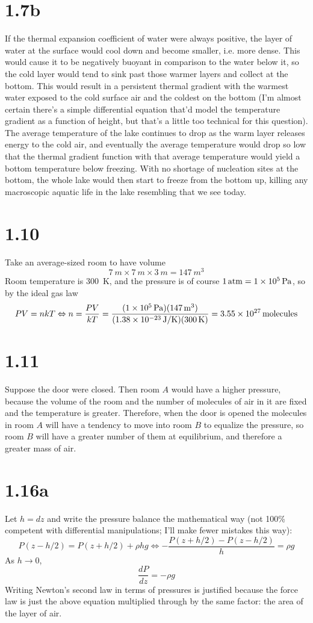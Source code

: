 \documentclass{article}
\begin{document}
\section*{1.7b}
If the thermal expansion coefficient of water were always positive, the layer of water at the surface would cool down and become smaller, i.e. more dense. This would cause it to be negatively buoyant in comparison to the water below it, so the cold layer would tend to sink past those warmer layers and collect at the bottom. This would result in a persistent thermal gradient with the warmest water exposed to the cold surface air and the coldest on the bottom (I'm almost certain there's a simple differential equation that'd model the temperature gradient as a function of height, but that's a little too technical for this question). The average temperature of the lake continues to drop as the warm layer releases energy to the cold air, and eventually the average temperature would drop so low that the thermal gradient function with that average temperature would yield a bottom temperature below freezing. With no shortage of nucleation sites at the bottom, the whole lake would then start to freeze from the bottom up, killing any macroscopic aquatic life in the lake resembling that we see today.

\section*{1.10}
Take an average-sized room to have volume
\[\SI{7}{m}\times\SI{7}{m}\times\SI{3}{m}=\SI{147}{m^3}\]
Room temperature is \SI{300}{K}, and the pressure is of course $\SI{1}{atm}=\SI{1E5}{Pa}$, so by the ideal gas law
\[PV=nkT\Leftrightarrow n=\frac{PV}{kT}=\frac{(\SI{1E5}{Pa})(\SI{147}{m^3})}{(\SI{1.38E-23}{J/K})(\SI{300}{K})}=\SI{3.55E27}{molecules}\]

\section*{1.11}
Suppose the door were closed. Then room $A$ would have a higher pressure, because the volume of the room and the number of molecules of air in it are fixed and the temperature is greater. Therefore, when the door is opened the molecules in room $A$ will have a tendency to move into room $B$ to equalize the pressure, so room $B$ will have a greater number of them at equilibrium, and therefore a greater mass of air.

\section*{1.16a}
Let $h=dz$ and write the pressure balance the mathematical way (not 100\% competent with differential manipulations; I'll make fewer mistakes this way):
\[P(z-h/2)=P(z+h/2)+\rho hg\Leftrightarrow -\frac{P(z+h/2)-P(z-h/2)}{h}=\rho g\]
As $h\to 0$,
\[\frac{dP}{dz}=-\rho g\]
Writing Newton's second law in terms of pressures is justified because the force law is just the above equation multiplied through by the same factor: the area of the layer of air.
\end{document}
